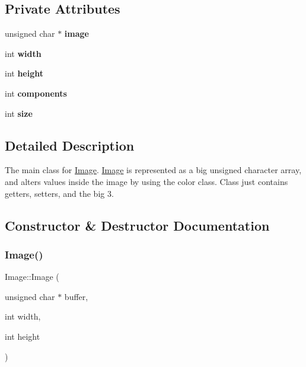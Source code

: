 \subsection*{Private Attributes}
\begin{DoxyCompactItemize}
\item 
\mbox{\label{classImage_a9a2c38d0f90325c4526e658463638a3d}} 
unsigned char $\ast$ {\bfseries image}
\item 
\mbox{\label{classImage_ab8d12f635013c04159cd4d3d972bac88}} 
int {\bfseries width}
\item 
\mbox{\label{classImage_a51df43db420c9c0b57536cb2dd36de5c}} 
int {\bfseries height}
\item 
\mbox{\label{classImage_ac6bbfcf18fdb753ab56cd0d6e21b8d76}} 
int {\bfseries components}
\item 
\mbox{\label{classImage_af9a53c18c62335dae6139bfa04667cc5}} 
int {\bfseries size}
\end{DoxyCompactItemize}


\subsection{Detailed Description}
The main class for \hyperlink{classImage}{Image}. \hyperlink{classImage}{Image} is represented as a big unsigned character array, and alters values inside the image by using the color class. Class just contains getters, setters, and the big 3. 

\subsection{Constructor \& Destructor Documentation}
\mbox{\label{classImage_a50994051928f5e597226aea5139aea6d}} 
\subsubsection{\texorpdfstring{Image()}{Image()}}
{\footnotesize\ttfamily Image\+::\+Image (\begin{DoxyParamCaption}\item[{unsigned char $\ast$}]{buffer,  }\item[{int}]{width,  }\item[{int}]{height }\end{DoxyParamCaption})}



